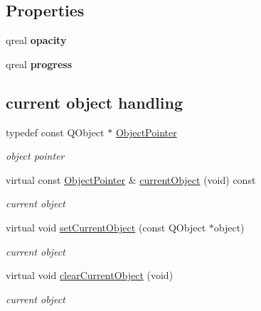 \subsection*{Properties}
\begin{DoxyCompactItemize}
\item 
\mbox{\label{class_tool_bar_data_a7d98baf0a8287930cdb2f158516913be}} 
qreal {\bfseries opacity}
\item 
\mbox{\label{class_tool_bar_data_a0894462877462c0457aa22e07e8d9ef7}} 
qreal {\bfseries progress}
\end{DoxyCompactItemize}
\subsection*{current object handling}
\begin{DoxyCompactItemize}
\item 
typedef const Q\+Object $\ast$ \hyperlink{class_tool_bar_data_a0cdad07ed8a8ca873e2fa53ef19de613}{Object\+Pointer}
\begin{DoxyCompactList}\small\item\em object pointer \end{DoxyCompactList}\item 
\mbox{\label{class_tool_bar_data_a84fc353ce7a6346a499120ec0a5b1195}} 
virtual const \hyperlink{class_tool_bar_data_a0cdad07ed8a8ca873e2fa53ef19de613}{Object\+Pointer} \& \hyperlink{class_tool_bar_data_a84fc353ce7a6346a499120ec0a5b1195}{current\+Object} (void) const
\begin{DoxyCompactList}\small\item\em current object \end{DoxyCompactList}\item 
\mbox{\label{class_tool_bar_data_af0299ff529db3eed493ab74f6f200559}} 
virtual void \hyperlink{class_tool_bar_data_af0299ff529db3eed493ab74f6f200559}{set\+Current\+Object} (const Q\+Object $\ast$object)
\begin{DoxyCompactList}\small\item\em current object \end{DoxyCompactList}\item 
\mbox{\label{class_tool_bar_data_a2d2b7a592283587881b4da660d03e063}} 
virtual void \hyperlink{class_tool_bar_data_a2d2b7a592283587881b4da660d03e063}{clear\+Current\+Object} (void)
\begin{DoxyCompactList}\small\item\em current object \end{DoxyCompactList}\end{DoxyCompactItemize}
